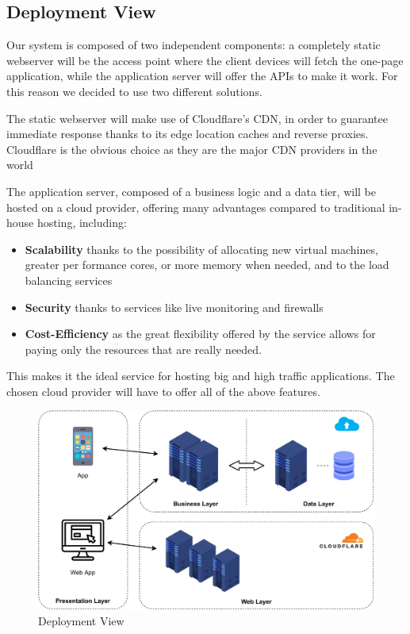 \subsection{Deployment View}
Our system is composed of two independent components: a completely static webserver will be the access point where the client devices will fetch the one-page application, while the application server will offer the APIs to make it work.
For this reason we decided to use two different solutions.

The static webserver will make use of Cloudflare's CDN, in order to guarantee immediate response thanks to its edge location caches and reverse proxies. Cloudflare is the obvious choice as they are the major CDN providers in the world

The application server, composed of a business logic and a data tier, will be hosted on a cloud provider, offering many advantages compared to traditional in-house hosting, including:
\begin{itemize}
    \item \textbf{Scalability} thanks to the possibility of allocating new virtual machines, greater per formance cores, or more memory when needed, and to the load balancing services
    \item \textbf{Security} thanks to services like live monitoring and firewalls
    \item \textbf{Cost-Efficiency} as the great flexibility offered by the service allows for paying only the resources that are really needed.
\end{itemize}
This makes it the ideal service for hosting big and high traffic applications. The chosen cloud provider will have to offer all of the above features.

\begin{figure}[H]
    \includegraphics[width=\linewidth]{images/draw.io/deployment.pdf}
    \caption{Deployment View}
    \label{fig:deployment_view}
\end{figure}

